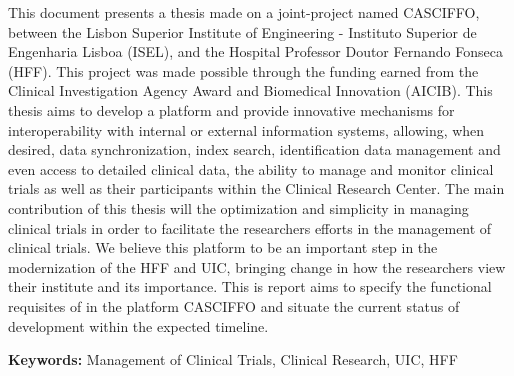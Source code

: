
This document presents a thesis made on a joint-project named CASCIFFO, between the Lisbon Superior Institute of Engineering - Instituto Superior de Engenharia Lisboa (ISEL), and the Hospital Professor Doutor Fernando Fonseca (HFF). This project was made possible through the funding earned from the Clinical Investigation Agency Award and Biomedical Innovation (AICIB). 
This thesis aims to develop a platform and provide innovative mechanisms for interoperability with internal or external information systems, allowing, when desired, data synchronization, index search, identification data management and even access to detailed clinical data, the ability to manage and monitor clinical trials as well as their participants within the Clinical Research Center. 
The main contribution of this thesis will the optimization and simplicity in managing clinical trials in order to facilitate the researchers efforts in the management of clinical trials.
We believe this platform to be an important step in the modernization of the HFF and UIC, bringing change in how the researchers view their institute and its importance. 
This is report aims to specify the functional requisites of in the platform CASCIFFO and situate the current status of development within the expected timeline. 

\textbf{Keywords:} Management of Clinical Trials, Clinical Research, UIC, HFF